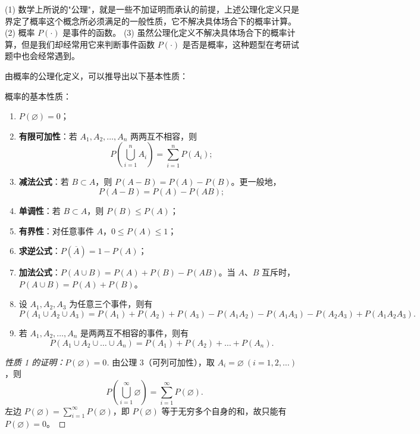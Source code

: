 \documentclass[lang=cn,11pt]{elegantbook}
\begin{document}
\begin{remark}
(1) 数学上所说的"公理"，就是一些不加证明而承认的前提，上述公理化定义只是界定了概率这个概念所必须满足的一般性质，它不解决具体场合下的概率计算。\newline
(2) 概率 \(P(\cdot)\) 是事件的函数。\newline
(3) 虽然公理化定义不解决具体场合下的概率计算，但是我们却经常用它来判断事件函数 \(P(\cdot)\) 是否是概率，这种题型在考研试题中也会经常遇到。
\end{remark}

由概率的公理化定义，可以推导出以下基本性质：

\begin{property}\label{prop:probability-basic}
概率的基本性质：
\begin{enumerate}
    \item \(P(\varnothing) = 0\)；
    \item \textbf{有限可加性}：若 \(A_1, A_2, \dots, A_n\) 两两互不相容，则
    \[
    P\!\left(\bigcup_{i=1}^{n} A_i\right) = \sum_{i=1}^{n} P(A_i);
    \]
    \item \textbf{减法公式}：若 \(B \subset A\)，则 \(P(A - B) = P(A) - P(B)\)。更一般地，
    \[
    P(A - B) = P(A) - P(AB);
    \]
    \item \textbf{单调性}：若 \(B \subset A\)，则 \(P(B) \le P(A)\)；
    \item \textbf{有界性}：对任意事件 \(A\)，\(0 \le P(A) \le 1\)；
    \item \textbf{求逆公式}：\(P(\overline{A}) = 1 - P(A)\)；
    \item \textbf{加法公式}：\(P(A \cup B) = P(A) + P(B) - P(AB)\)。当 \(A\)、\(B\) 互斥时，\(P(A \cup B) = P(A) + P(B)\)。
    \item 设 \(A_1, A_2, A_3\) 为任意三个事件，则有
    \[
    P(A_1 \cup A_2 \cup A_3) = P(A_1) + P(A_2) + P(A_3) - P(A_1A_2) - P(A_1A_3) - P(A_2A_3) + P(A_1A_2A_3).
    \]
    \item 若 \(A_1, A_2, \dots, A_n\) 是两两互不相容的事件，则有
    \[
    P(A_1 \cup A_2 \cup \dots \cup A_n) = P(A_1) + P(A_2) + \dots + P(A_n).
    \]
\end{enumerate}
\end{property}
\begin{proof}[性质 1 的证明：\(P(\varnothing)=0\)]
由公理 3（可列可加性），取 \(A_i = \varnothing\ (i=1,2,\dots)\)，则
\[
P\!\left(\bigcup_{i=1}^{\infty} \varnothing\right) = \sum_{i=1}^{\infty} P(\varnothing).
\]
左边 \(P(\varnothing) = \sum_{i=1}^{\infty} P(\varnothing)\)，即 \(P(\varnothing)\) 等于无穷多个自身的和，故只能有 \(P(\varnothing) = 0\)。
\end{proof}
\end{document}
